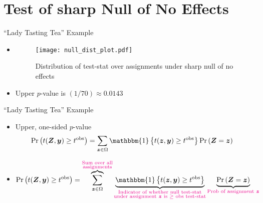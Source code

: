\documentclass[table, xcolor = {dvipsnames}, 9pt]{beamer}
\theoremstyle{plain}
\begin{document}
\section{Test of sharp Null of No Effects}
\begin{frame}{``Lady Tasting Tea'' Example}
\vfill
\begin{itemize}
\item[]
\begin{figure}[H]
\texttt{[image: null\_dist\_plot.pdf]}
\caption{Distribution of test-stat over assignments under sharp null of no effects}
\end{figure} \vfill
\vspace{-2em}
\item Upper $p$-value is $(1/70) \approx 0.0143$
\end{itemize}  
\end{frame}
\begin{frame}{``Lady Tasting Tea'' Example}
\vfill
\begin{itemize} \vfill
\item Upper, one-sided $p$-value \vfill
\begin{align*}
\Pr\left(t(\bm{Z}, \bm{y}) \geq t^{\text{obs}}\right) & = \sum \limits_{\bm{z} \in \Omega} \mathbbm{1}\left\{t(\bm{z}, \bm{y}) \geq t^{\text{obs}}\right\} \Pr\left(\bm{Z} = \bm{z}\right)
\end{align*} \vfill
\item[] \pause
\begin{align*}
\Pr\left(t(\bm{Z}, \bm{y}) \geq t^{\text{obs}}\right) & = \overbrace{\sum \limits_{\bm{z} \in \Omega}}^{\substack{\textcolor{magenta}{\text{Sum over all}} \\ \textcolor{magenta}{\text{assignments}}}} \underbrace{\mathbbm{1}\left\{t(\bm{z}, \bm{y}) \geq t^{\text{obs}}\right\}}_{\substack{\textcolor{magenta}{\text{Indicator of whether null test-stat}} \\ \textcolor{magenta}{\text{under assignment } \bm{z} \text{ is } \geq \text{ obs test-stat}}}} \underbrace{\Pr\left(\bm{Z} = \bm{z}\right)}_{\textcolor{magenta}{\text{Prob of assignment } \bm{z}}}
\end{align*} \vfill
\end{itemize} \vfill
\end{frame}
\end{document}
